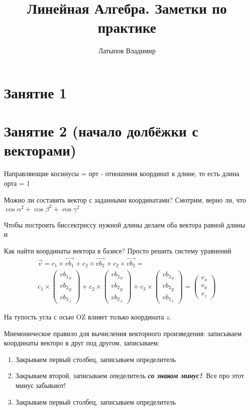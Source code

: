 \documentclass[12pt, a4paper]{article}
\title{Линейная Алгебра. Заметки по практике}
\author{Латыпов Владимир}
\begin{document}
    \tittoc

    \section{Занятие 1} 

    \section{Занятие 2 (начало долбёжки с векторами)}
    Направляющие косинусы = орт - отношения координат к длине, то есть длина орта = 1

    Можно ли составить вектор с заданными координатами? Смотрим, верно ли, что 
    $\cos{\alpha}^2 + \cos{\beta}^2 + \cos{\gamma}^2$

    Чтобы построить биссектриссу нужной длины делаем оба вектора равной длины и 


    Как найти координаты вектора в базисе? Просто решить систему уравнений 
    \begin{multline}
            \vec{v} = c_1 \times \vec{vb_1} + c_2 \times \vec{vb_2} + c_2 \times \vec{vb_2} = \\
            c_1 \times \begin{pmatrix}
                {vb_1}_{x}\\
                {vb_2}_{y} \\
                {vb_3}_{z}
        \end{pmatrix} + 
        c_2 \times \begin{pmatrix}
            {vb_2}_{x}\\
            {vb_2}_{y} \\
            {vb_2}_{z}
        \end{pmatrix}
        + c_3 \times \begin{pmatrix}
        {vb_3}_{x}\\
        {vb_3}_{y} \\
        {vb_3}_{z}
        \end{pmatrix} = \begin{pmatrix}
            {v}_{x}\\
            {v}_{y} \\
            {v}_{z}
            \end{pmatrix}
    \end{multline}

    На тупость угла с осью OZ влияет только координата $z$.

    Мнемоническое правило для вычисления векторного произведения: 
    записываем координаты векторо в друг под другом, записываем:
    \begin{enumerate}
        \item Закрываем первый столбец, записываем определитель
        \item Закрываем второй, записываем опеделитель \textit{\textbf{со знаком минус!}}. Все про этот минус забывают!
        \item Закрываем первый столбец, записываем определитель
    \end{enumerate}
\end{document}
